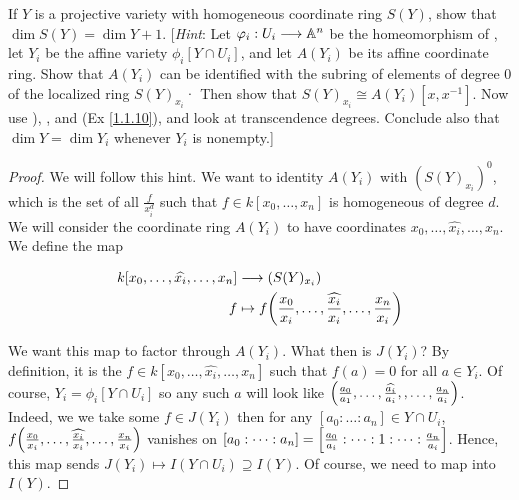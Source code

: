 \label{1.2.6}

If $Y$ is a projective variety with homogeneous coordinate ring $S(Y)$, show that
$\dim S(Y) = \dim Y + 1$. [\textit{Hint}: Let $\varphi_i: U_i \longrightarrow \mathbb A^n$ be the homeomorphism of \cite[2.2]{hartshorne},
let $Y_i$ be the affine variety $\phi_i[Y \cap U_i]$, and let $A(Y_i)$ be its affine coordinate ring. Show that $A(Y_i)$ can be identified with the subring of elements of degree $0$ of the
localized ring $S(Y)_{x_i}$· Then show that $S(Y)_{x_i} \cong A(Y_i)[x, x^{-1}]$. Now use \cite[1.7]{hartshorne}),
\cite[1.8A]{hartshorne}, and (Ex \ref{1.1.10}), and look at transcendence degrees. Conclude also that $\dim Y = \dim Y_i$ whenever $Y_i$ is nonempty.]

\begin{proof}
    We will follow this hint. We want to identity $A(Y_i)$ with $(S(Y)_{x_i})^0$, which is the set of all $\frac{f}{x_i^d}$ such that $f \in k[x_0, \dots, x_n]$ is homogeneous of degree $d$. We will consider the coordinate ring $A(Y_i)$ to have coordinates $x_0, \dots, \widehat{x_i}, \dots, x_n$. We define the map

    \begin{align*}
        k[x_0, \dots, \widehat{x_i}, \dots, x_n] &\longrightarrow (S(Y)_{x_i})\\
        f &\mapsto f{\left(\frac{x_0}{x_i}, \dots, \widehat{\frac{x_i}{x_i}}, \dots, \frac{x_n}{x_i}\right)}
    \end{align*}

    We want this map to factor through $A(Y_i)$. What then is $J(Y_i)$? By definition, it is the $f \in k[x_0, \dots, \widehat{x_i}, \dots, x_n]$ such that $f(a) = 0$ for all $a \in Y_i$. Of course, $Y_i = \phi_i[Y \cap U_i]$ so any such $a$ will look like ${\left(\frac{a_0}{a_1}, \dots, \widehat{\frac{a_i}{a_i}},, \dots, \frac{a_n}{a_i}\right)}$. Indeed, we we take some $f \in J(Y_i)$ then for any $[a_0 : \dots : a_n] \in Y \cap U_i$, $f{\left(\frac{x_0}{x_i}, \dots, \widehat{\frac{x_i}{x_i}}, \dots, \frac{x_n}{x_i}\right)}$ vanishes on $[a_0 : \dots : a_n] = {\left[\frac{a_0}{a_i} : \dots : 1 : \dots : \frac{a_n}{a_i}\right]}$. Hence, this map sends $J(Y_i) \mapsto I(Y \cap U_i) \supseteq I(Y)$. Of course, we need to map into $I(Y)$.
\end{proof}
